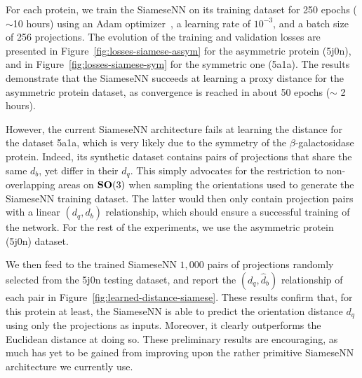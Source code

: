 For each protein, we train the SiameseNN on its training dataset for 250 epochs ($\sim$10 hours) using an Adam optimizer~\cite{kingma2014adam}, a learning rate of $10^{-3}$, and a batch size of 256 projections. The evolution of the training and validation losses are presented in Figure~\ref{fig:losses-siamese-assym} for the asymmetric protein (5j0n), and in Figure~\ref{fig:losses-siamese-sym} for the symmetric one (5a1a). The results demonstrate that the SiameseNN succeeds at learning a proxy distance for the asymmetric protein dataset, as convergence is reached in about 50 epochs ($\sim$ 2 hours). 

However, the current SiameseNN architecture fails at learning the distance for the dataset 5a1a, which is very likely due to the symmetry of the $\beta$-galactosidase protein. Indeed, its synthetic dataset contains pairs of projections that share the same $d_b$, yet differ in their $d_q$. This simply advocates for the restriction to non-overlapping areas on $\mathrm{\mathbf{SO}}(3)$ when sampling the orientations used to generate the SiameseNN training dataset. The latter would then only contain projection pairs with a linear $(d_q,d_b)$ relationship, which should ensure a successful training of the network. For the rest of the experiments, we use the asymmetric protein (5j0n) dataset. 

We then feed to the trained SiameseNN $1,000$ pairs of projections randomly selected from the 5j0n testing dataset, and report the $(d_q,\widehat{d}_b)$ relationship of each pair in Figure~\ref{fig:learned-distance-siamese}. These results confirm that, for this protein at least, the SiameseNN is able to predict the orientation distance $d_q$ using only the projections as inputs. Moreover, it clearly outperforms the Euclidean distance at doing so. These preliminary results are encouraging, as much has yet to be gained from improving upon the rather primitive SiameseNN architecture we currently use.